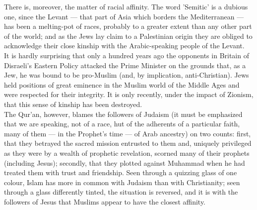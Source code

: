 \documentclass[10pt, twoside]{book}
\begin{document}
There is, moreover, the matter of racial affinity. The word 'Semitic' is a dubious one, since the 
Levant --- that part of Asia which borders the Mediterranean --- has been a melting\hyp{}pot of races, 
probably to a greater extent than any other part of the world; and as the Jews lay claim to a 
Palestinian origin they are obliged to acknowledge their close kinship with the Arabic\hyp{}speaking 
people of the Levant. \\

It is hardly surprising that only a hundred years ago the opponents in Britain of Disraeli's Eastern 
Policy attacked the Prime Minister on the grounds that, as a Jew, he was bound to be pro\hyp{}Muslim (and, 
by implication, anti\hyp{}Christian). Jews held positions of great eminence in the Muslim world of the 
Middle Ages and were respected for their integrity. It is only recently, under the impact of Zionism, 
that this sense of kinship has been destroyed. \\

The Qur'an, however, blames the followers of Judaism (it must be emphasized that we are speaking, not 
of a race, hut of the adherents of a particular faith, many of them --- in the Prophet's time --- of Arab 
ancestry) on two counts: first, that they betrayed the sacred mission entrusted to them and, uniquely 
privileged as they were by a wealth of prophetic revelation, scorned many of their prophets 
(including Jesus); secondly, that they plotted against Muhammad when he had treated them with trust 
and friendship. Seen through a quizzing glass of one colour, Islam has more in common with Judaism 
than with Christianity; seen through a glass differently tinted, the situation is reversed, and it is 
with the followers of Jesus that Muslims appear to have the closest affinity. \\
\end{document}
